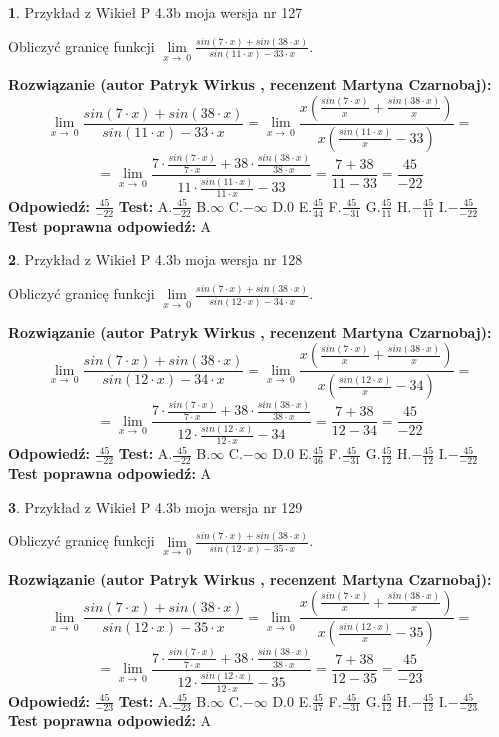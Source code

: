 \documentclass[12pt, a4paper]{article}
\theoremstyle{definition} %
\newtheorem{zad}{}
\newcommand{\zadStart}[1]{\begin{zad}#1\newline}
\newcommand{\zadStop}{\end{zad}}
\newcommand{\rozwStart}[2]{\noindent \textbf{Rozwiązanie (autor #1 , recenzent #2): }\newline}
\newcommand{\rozwStop}{\newline}
\newcommand{\odpStart}{\noindent \textbf{Odpowiedź:}\newline}
\newcommand{\odpStop}{\newline}
\newcommand{\testStart}{\noindent \textbf{Test:}\newline}
\newcommand{\testStop}{\newline}
\newcommand{\kluczStart}{\noindent \textbf{Test poprawna odpowiedź:}\newline}
\newcommand{\kluczStop}{\newline}
\begin{document}
\zadStart{Przykład z Wikieł P 4.3b moja wersja nr 127}


Obliczyć granicę funkcji $\lim\limits_{x\to\ 0}\frac{sin(7 \cdot x)+sin(38 \cdot x)}{sin(11 \cdot x)-33 \cdot x}$.
\zadStop
\rozwStart{Patryk Wirkus}{Martyna Czarnobaj}
$$\lim\limits_{x\to\ 0}\frac{sin(7 \cdot x)+sin(38 \cdot x)}{sin(11 \cdot x)-33 \cdot x}=\lim\limits_{x\to\ 0}\frac{x(\frac{sin(7 \cdot x)}{x}+\frac{sin(38 \cdot x)}{x})}{x(\frac{sin(11 \cdot x)}{x}-33)}=$$
$$=\lim\limits_{x\to\ 0}\frac{7 \cdot \frac{sin(7 \cdot x)}{7 \cdot x}+38 \cdot \frac{sin(38 \cdot x)}{38 \cdot x}}{11 \cdot \frac{sin(11 \cdot x)}{11 \cdot x}-33}=\frac{7+38}{11-33} = \frac{45}{-22}$$
\rozwStop
\odpStart
$\frac{45}{-22}$
\odpStop
\testStart
A.$\frac{45}{-22}$
B.$\infty$
C.$-\infty$
D.$0$
E.$\frac{45}{44}$
F.$\frac{45}{-31}$
G.$\frac{45}{11}$
H.$-\frac{45}{11}$
I.$-\frac{45}{-22}$
\testStop
\kluczStart
A
\kluczStop



\zadStart{Przykład z Wikieł P 4.3b moja wersja nr 128}


Obliczyć granicę funkcji $\lim\limits_{x\to\ 0}\frac{sin(7 \cdot x)+sin(38 \cdot x)}{sin(12 \cdot x)-34 \cdot x}$.
\zadStop
\rozwStart{Patryk Wirkus}{Martyna Czarnobaj}
$$\lim\limits_{x\to\ 0}\frac{sin(7 \cdot x)+sin(38 \cdot x)}{sin(12 \cdot x)-34 \cdot x}=\lim\limits_{x\to\ 0}\frac{x(\frac{sin(7 \cdot x)}{x}+\frac{sin(38 \cdot x)}{x})}{x(\frac{sin(12 \cdot x)}{x}-34)}=$$
$$=\lim\limits_{x\to\ 0}\frac{7 \cdot \frac{sin(7 \cdot x)}{7 \cdot x}+38 \cdot \frac{sin(38 \cdot x)}{38 \cdot x}}{12 \cdot \frac{sin(12 \cdot x)}{12 \cdot x}-34}=\frac{7+38}{12-34} = \frac{45}{-22}$$
\rozwStop
\odpStart
$\frac{45}{-22}$
\odpStop
\testStart
A.$\frac{45}{-22}$
B.$\infty$
C.$-\infty$
D.$0$
E.$\frac{45}{46}$
F.$\frac{45}{-31}$
G.$\frac{45}{12}$
H.$-\frac{45}{12}$
I.$-\frac{45}{-22}$
\testStop
\kluczStart
A
\kluczStop



\zadStart{Przykład z Wikieł P 4.3b moja wersja nr 129}


Obliczyć granicę funkcji $\lim\limits_{x\to\ 0}\frac{sin(7 \cdot x)+sin(38 \cdot x)}{sin(12 \cdot x)-35 \cdot x}$.
\zadStop
\rozwStart{Patryk Wirkus}{Martyna Czarnobaj}
$$\lim\limits_{x\to\ 0}\frac{sin(7 \cdot x)+sin(38 \cdot x)}{sin(12 \cdot x)-35 \cdot x}=\lim\limits_{x\to\ 0}\frac{x(\frac{sin(7 \cdot x)}{x}+\frac{sin(38 \cdot x)}{x})}{x(\frac{sin(12 \cdot x)}{x}-35)}=$$
$$=\lim\limits_{x\to\ 0}\frac{7 \cdot \frac{sin(7 \cdot x)}{7 \cdot x}+38 \cdot \frac{sin(38 \cdot x)}{38 \cdot x}}{12 \cdot \frac{sin(12 \cdot x)}{12 \cdot x}-35}=\frac{7+38}{12-35} = \frac{45}{-23}$$
\rozwStop
\odpStart
$\frac{45}{-23}$
\odpStop
\testStart
A.$\frac{45}{-23}$
B.$\infty$
C.$-\infty$
D.$0$
E.$\frac{45}{47}$
F.$\frac{45}{-31}$
G.$\frac{45}{12}$
H.$-\frac{45}{12}$
I.$-\frac{45}{-23}$
\testStop
\kluczStart
A
\kluczStop
\end{document}
